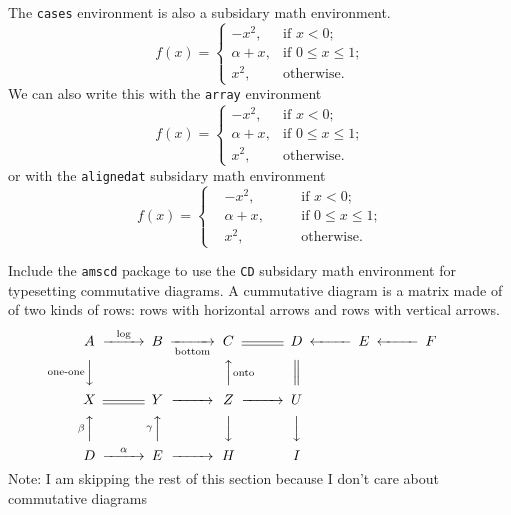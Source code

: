 \documentclass[12pt]{amsart}
\begin{document}
The \texttt{cases} environment is also a subsidary math environment. 
\begin{equation}
   f(x)=
   \begin{cases}
      -x^{2}, 		&\text{if \(x < 0\);}\\
      \alpha + x, 	&\text{if \(0 \leq x \leq 1\);}\\
      x^{2},		&\text{otherwise.}
   \end{cases}
\end{equation}
We can also write this with the \texttt{array} environment
\begin{equation}
   f(x) =
   \left\{
   \begin{array}{ll}
      -x^{2}, 		&\text{if \(x < 0\);}\\
      \alpha + x, 	&\text{if \(0 \leq x \leq 1\);}\\
      x^{2},		&\text{otherwise.}
   \end{array}
   \right.
\end{equation}
or with the \texttt{alignedat} subsidary math environment
\begin{equation}
   f(x) =
   \left\{
   \begin{alignedat}{2}
      &-x^{2}, 		&&\quad\text{if \(x < 0\);}\\
      &\alpha + x, 	&&\quad\text{if \(0 \leq x \leq 1\);}\\
      &x^{2},		&&\quad\text{otherwise.}
   \end{alignedat}
   \right.
\end{equation}
\vspace{15 pt}

Include the \texttt{amscd} package to use the \texttt{CD} subsidary math environment for typesetting commutative diagrams. A cummutative diagram is a matrix made of of two kinds of rows: rows with horizontal arrows and rows with vertical arrows.
\[
\begin{CD}
A 	@>\text{log}>>B 	@>>\text{bottom}> C 	@= D 	@<<< E 	@<<< F \\
@V\text{one-one}VV 	@. @AA\text{onto}A @| \\
X @= Y @>>> Z @>>> U \\
@A\beta AA @A\gamma AA @VVV @VVV \\
D @>\alpha >> E @>>> H @. I
\end{CD}
\]
Note: I am skipping the rest of this section because I don't care about commutative diagrams
\end{document}
